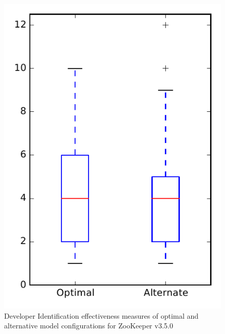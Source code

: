 
\begin{figure}
\centering
\includegraphics[height=0.4\textheight]{figures/combo/dit_rq1_zookeeper}
\caption{Developer Identification effectiveness measures of optimal and alternative model configurations for ZooKeeper v3.5.0}
\label{fig:combo:dit:rq1:zookeeper}
\end{figure}
